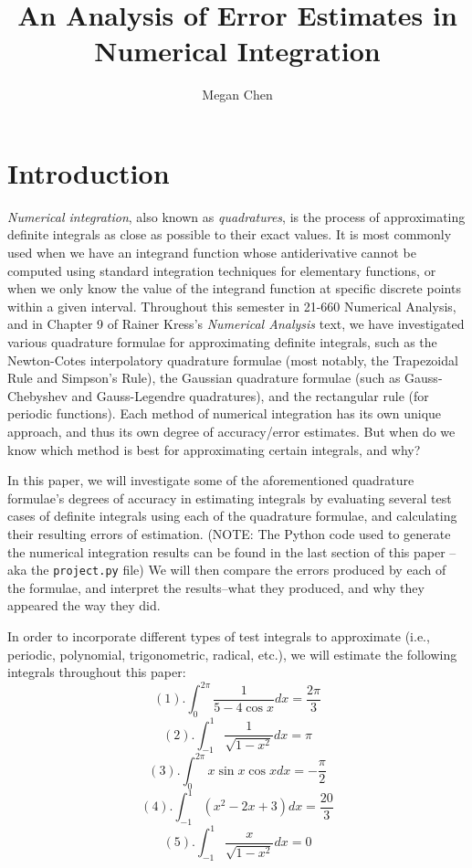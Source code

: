 \documentclass[a4paper,draft]{amsproc}
\theoremstyle{plain}
\theoremstyle{definition}
\theoremstyle{remark}
\numberwithin{equation}{section}
\begin{document}
\vspace{18mm} \setcounter{page}{1} \thispagestyle{empty}

\title{An Analysis of Error Estimates in Numerical Integration}
\author[An Analysis of Error Estimates in Numerical Integration]{Megan Chen}
\maketitle

\section{Introduction}

\emph{Numerical integration}, also known as \emph{quadratures}, is the process of approximating definite integrals as close as possible to their exact values. It is most commonly used when we have an integrand function whose antiderivative cannot be computed using standard integration techniques for elementary functions, or when we only know the value of the integrand function at specific discrete points within a given interval. Throughout this semester in 21-660 Numerical Analysis, and in Chapter 9 of Rainer Kress's \emph{Numerical Analysis} text, we have investigated various quadrature formulae for approximating definite integrals, such as the Newton-Cotes interpolatory quadrature formulae (most notably, the Trapezoidal Rule and Simpson's Rule), the Gaussian quadrature formulae (such as Gauss-Chebyshev and Gauss-Legendre quadratures), and the rectangular rule (for periodic functions). Each method of numerical integration has its own unique approach, and thus its own degree of accuracy/error estimates. But when do we know which method is best for approximating certain integrals, and why?

In this paper, we will investigate some of the aforementioned quadrature formulae's degrees of accuracy in estimating integrals by evaluating several test cases of definite integrals using each of the quadrature formulae, and calculating their resulting errors of estimation. (NOTE: The Python code used to generate the numerical integration results can be found in the last section of this paper -- aka the \verb+project.py+ file) We will then compare the errors produced by each of the formulae, and interpret the results--what they produced, and why they appeared the way they did.

In order to incorporate different types of test integrals to approximate (i.e., periodic, polynomial, trigonometric, radical, etc.), we will estimate the following integrals throughout this paper:
\[
(1). \displaystyle\int_{0}^{2\pi}\frac{1}{5-4\cos{x}}dx=\frac{2\pi}{3}
\]
\[
(2). \displaystyle\int_{-1}^{1}\frac{1}{\sqrt{1-x^2}}dx=\pi
\]
\[
(3). \displaystyle\int_{0}^{2\pi}x\sin{x}\cos{x}dx=-\frac{\pi}{2}
\]
\[
(4). \displaystyle\int_{-1}^{1}(x^2-2x+3)dx=\frac{20}{3}
\]
\[
(5). \displaystyle\int_{-1}^{1}\frac{x}{\sqrt{1-x^2}}dx=0
\]
\end{document}
